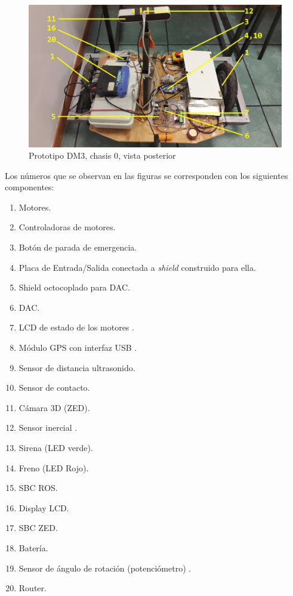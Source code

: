 \documentclass[withindex,glossary]{cam-thesis}
\begin{document}
\begin{figure}[H]
  \centering
  \begin{minipage}[b]{0.49\textwidth}
    \includegraphics[width=\textwidth]{images/Robot3}
    \caption[Prototipo DM3, chasis 0, vista posterior]{Prototipo DM3, chasis 0, vista posterior}
    \label{fig:PrototipoDM33}
  \end{minipage}
\end{figure}

Los números que se observan en las figuras se corresponden con los siguientes componentes:
\begin{enumerate}[noitemsep]
  \item Motores.
  \item Controladoras de motores.
  \item Botón de parada de emergencia.
  \item Placa de Entrada/Salida conectada a \textit{shield} construido para ella.
  \item Shield octocoplado para \gls{DAC}.
  \item DAC.
  \item LCD de estado de los motores \cite{LCD1602}.
  \item Módulo \gls{GPS} con interfaz \gls{USB} \cite{GPSModule}.
  \item Sensor de distancia ultrasonido.
  \item Sensor de contacto.
  \item Cámara 3D (ZED).
  \item Sensor inercial \cite{myAHRS}.
  \item Sirena (LED verde).
  \item Freno (LED Rojo).
  \item SBC ROS.
  \item Display LCD.
  \item SBC ZED.
  \item Batería.
  \item Sensor de ángulo de rotación (potenciómetro) \cite{Potenciometro}.
  \item Router.
\end{enumerate}
\end{document}
